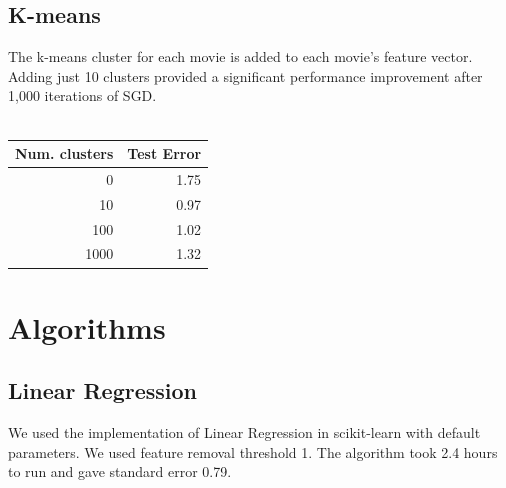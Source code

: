 \documentclass[journal]{IEEEtran}
\begin{document}
\subsection{K-means}
The k-means cluster for each movie is added to each movie's feature vector.
Adding just 10 clusters provided a significant performance improvement after
1,000 iterations of SGD.\\
\\
\begin{center}
\begin{tabular}{|r| r|} %
\hline
Num. clusters & Test Error  \\ [0.5ex] %
\hline
0 & 1.75 \\
10 & 0.97 \\
100 & 1.02 \\
1000 & 1.32 \\
\hline %
\end{tabular}
\end{center}

\section{Algorithms}

\subsection{Linear Regression}
We used the implementation of Linear Regression in scikit-learn with default
parameters. We used feature removal threshold 1. The algorithm took 2.4 hours
to run and gave standard error 0.79.
\end{document}
